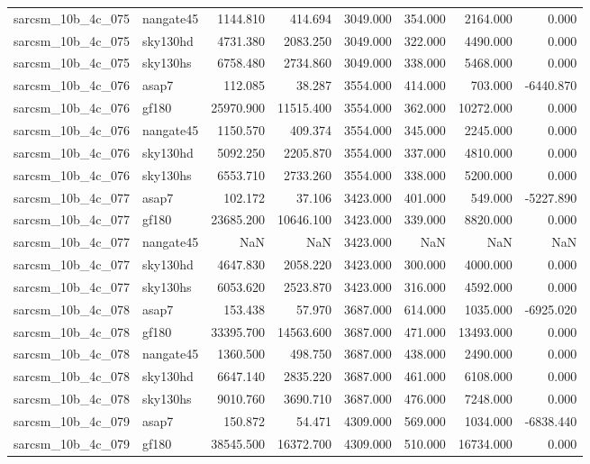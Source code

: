 \begin{tabular}{llrrrrrr}
sarcsm\_10b\_4c\_075 & nangate45 & 1144.810 & 414.694 & 3049.000 & 354.000 & 2164.000 & 0.000 \\
sarcsm\_10b\_4c\_075 & sky130hd & 4731.380 & 2083.250 & 3049.000 & 322.000 & 4490.000 & 0.000 \\
sarcsm\_10b\_4c\_075 & sky130hs & 6758.480 & 2734.860 & 3049.000 & 338.000 & 5468.000 & 0.000 \\
sarcsm\_10b\_4c\_076 & asap7 & 112.085 & 38.287 & 3554.000 & 414.000 & 703.000 & -6440.870 \\
sarcsm\_10b\_4c\_076 & gf180 & 25970.900 & 11515.400 & 3554.000 & 362.000 & 10272.000 & 0.000 \\
sarcsm\_10b\_4c\_076 & nangate45 & 1150.570 & 409.374 & 3554.000 & 345.000 & 2245.000 & 0.000 \\
sarcsm\_10b\_4c\_076 & sky130hd & 5092.250 & 2205.870 & 3554.000 & 337.000 & 4810.000 & 0.000 \\
sarcsm\_10b\_4c\_076 & sky130hs & 6553.710 & 2733.260 & 3554.000 & 338.000 & 5200.000 & 0.000 \\
sarcsm\_10b\_4c\_077 & asap7 & 102.172 & 37.106 & 3423.000 & 401.000 & 549.000 & -5227.890 \\
sarcsm\_10b\_4c\_077 & gf180 & 23685.200 & 10646.100 & 3423.000 & 339.000 & 8820.000 & 0.000 \\
sarcsm\_10b\_4c\_077 & nangate45 & NaN & NaN & 3423.000 & NaN & NaN & NaN \\
sarcsm\_10b\_4c\_077 & sky130hd & 4647.830 & 2058.220 & 3423.000 & 300.000 & 4000.000 & 0.000 \\
sarcsm\_10b\_4c\_077 & sky130hs & 6053.620 & 2523.870 & 3423.000 & 316.000 & 4592.000 & 0.000 \\
sarcsm\_10b\_4c\_078 & asap7 & 153.438 & 57.970 & 3687.000 & 614.000 & 1035.000 & -6925.020 \\
sarcsm\_10b\_4c\_078 & gf180 & 33395.700 & 14563.600 & 3687.000 & 471.000 & 13493.000 & 0.000 \\
sarcsm\_10b\_4c\_078 & nangate45 & 1360.500 & 498.750 & 3687.000 & 438.000 & 2490.000 & 0.000 \\
sarcsm\_10b\_4c\_078 & sky130hd & 6647.140 & 2835.220 & 3687.000 & 461.000 & 6108.000 & 0.000 \\
sarcsm\_10b\_4c\_078 & sky130hs & 9010.760 & 3690.710 & 3687.000 & 476.000 & 7248.000 & 0.000 \\
sarcsm\_10b\_4c\_079 & asap7 & 150.872 & 54.471 & 4309.000 & 569.000 & 1034.000 & -6838.440 \\
sarcsm\_10b\_4c\_079 & gf180 & 38545.500 & 16372.700 & 4309.000 & 510.000 & 16734.000 & 0.000 \\

\end{tabular}
